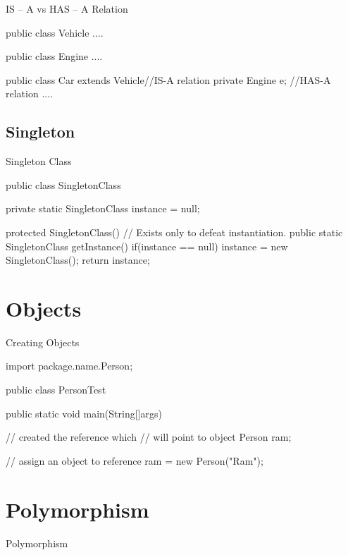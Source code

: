 \documentclass[11pt]{beamer}
\begin{document}
\begin{frame}[containsverbatim]{IS -- A vs HAS -- A Relation}
\begin{java}

public class Vehicle{
  ....
}

public class Engine{
  ....
}

public class Car extends Vehicle{//IS-A relation
  private Engine e;  //HAS-A relation
  ....
}
\end{java}
\end{frame}


\subsection{Singleton}
\begin{frame}[containsverbatim]{Singleton Class}
\begin{java}
public class SingletonClass{
private static SingletonClass instance = null;
	
	protected SingletonClass(){
		// Exists only to defeat instantiation.
	}
	public static SingletonClass getInstance(){
		if(instance == null){
			instance = new SingletonClass();
		}
		return instance;
	}
}
\end{java}
\end{frame}

\section{Objects}
\begin{frame}[containsverbatim]{Creating Objects}
\begin{java}
import package.name.Person;

public class PersonTest{

	public static void main(String[]args){
	
		// created the reference which 
		// will point to object
		Person ram;
		
		// assign an object to reference
		ram = new Person("Ram");
	}
}
\end{java}
\end{frame}

\section{Polymorphism}
\begin{frame}[containsverbatim]{Polymorphism}

\end{frame}
\end{document}
